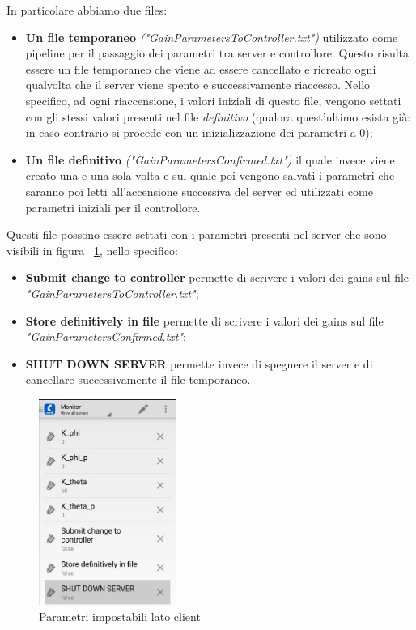 In particolare abbiamo due files:
\begin{itemize}
	\item \textbf{Un file temporaneo} \textit{("GainParametersToController.txt")} utilizzato come pipeline per il passaggio dei parametri tra server e controllore. Questo risulta essere un file temporaneo che viene ad essere cancellato e ricreato ogni qualvolta che il server viene spento e successivamente riaccesso.
	Nello specifico, ad ogni riaccensione, i valori iniziali di questo file, vengono settati con gli stessi valori presenti nel file \textit{definitivo}  (qualora quest'ultimo esista già: in caso contrario si procede con un inizializzazione dei parametri a 0);
	
	\item \textbf{Un file definitivo} \textit{("GainParametersConfirmed.txt")} il quale invece viene creato una e una sola volta e sul quale poi vengono salvati i parametri che saranno poi letti all'accensione successiva del server ed utilizzati come parametri iniziali per il controllore.
\end{itemize}

Questi file possono essere settati con i parametri presenti nel server che sono visibili in figura ~\ref{fig:OPCUA_params}, nello specifico:
\begin{itemize}
	\item \textbf{Submit change to controller} permette di scrivere i valori dei gains sul file \textit{"GainParametersToController.txt"};
	
	\item \textbf{Store definitively in file} permette di scrivere i valori dei gains sul file \textit{"GainParametersConfirmed.txt"};
	
	\item \textbf{SHUT DOWN SERVER} permette invece di spegnere il server e di cancellare successivamente il file temporaneo.
\end{itemize}

\begin{figure}[h]
	\centering   	
	\includegraphics[width=0.4\textwidth]{Immagini/OPC_UA_params.jpg}
	\caption{Parametri impostabili lato client}
	\label{fig:OPCUA_params}
\end{figure}


